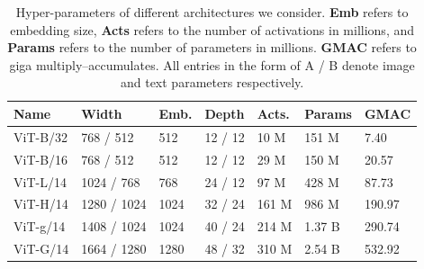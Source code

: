 \begin{appendix}
\begin{table}[h!]
\begin{tabular}{@{}lllllll@{}}
\toprule
\textbf{Name} & \textbf{Width}  & \textbf{Emb.} & \textbf{Depth} & \textbf{Acts.} & \textbf{Params} & \textbf{GMAC} \\ \midrule
ViT-B/32      & 768 / 512                 & 512                & 12 / 12    & 10 M  & 151 M & 7.40 \\
ViT-B/16      & 768 / 512                 & 512                & 12 / 12    & 29 M  & 150 M & 20.57\\
ViT-L/14     & 1024 / 768                 & 768                & 24 / 12    & 97 M  & 428 M & 87.73 \\ 
ViT-H/14     & 1280 / 1024                & 1024               & 32 / 24    & 161 M  & 986 M & 190.97\\ 
ViT-g/14     & 1408 / 1024                & 1024               & 40 / 24    & 214 M  & 1.37 B & 290.74 \\ 
ViT-G/14     & 1664 / 1280                & 1280               & 48 / 32    & 310 M  & 2.54 B & 532.92 \\ 
\bottomrule
\end{tabular}
\caption{Hyper-parameters of different architectures we consider. \textbf{Emb} refers to embedding size, \textbf{Acts} refers to the number of activations in millions, and \textbf{Params} refers to the number of parameters in millions. \textbf{GMAC} refers to giga multiply–accumulates. All entries in the form of A / B denote image and text parameters respectively.} 
\label{table:openclip_architectures}
\end{table}



\end{appendix}
